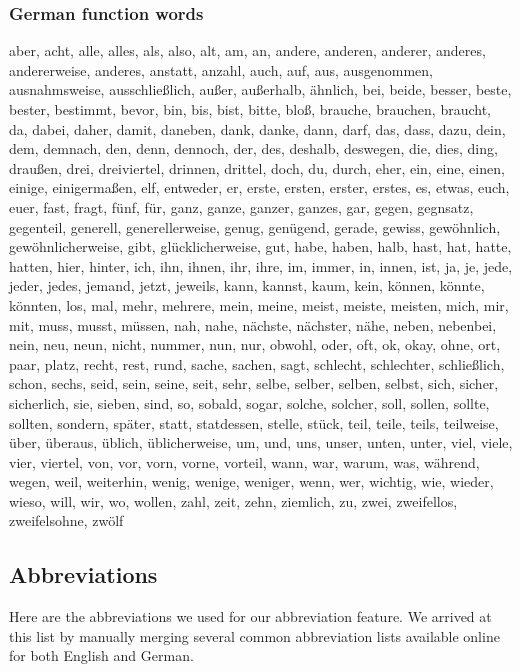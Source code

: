 \subsubsection{German function words}
aber, acht, alle, alles, als, also, alt, am, an, andere, anderen, anderer, anderes, andererweise, anderes, anstatt, anzahl, auch, auf, aus, ausgenommen, ausnahmsweise, ausschließlich, außer, außerhalb, ähnlich, bei, beide, besser, beste, bester, bestimmt, bevor, bin, bis, bist, bitte, bloß, brauche, brauchen, braucht, da, dabei, daher, damit, daneben, dank, danke, dann, darf, das, dass, dazu, dein, dem, demnach, den, denn, dennoch, der, des, deshalb, deswegen, die, dies, ding, draußen, drei, dreiviertel, drinnen, drittel, doch, du, durch, eher, ein, eine, einen, einige, einigermaßen, elf, entweder, er, erste, ersten, erster, erstes, es, etwas, euch, euer, fast, fragt, fünf, für, ganz, ganze, ganzer, ganzes, gar, gegen, gegnsatz, gegenteil, generell, generellerweise, genug, genügend, gerade, gewiss, gewöhnlich, gewöhnlicherweise, gibt, glücklicherweise, gut, habe, haben, halb, hast, hat, hatte, hatten, hier, hinter, ich, ihn, ihnen, ihr, ihre, im, immer, in, innen, ist, ja, je, jede, jeder, jedes, jemand, jetzt, jeweils, kann, kannst, kaum, kein, können, könnte, könnten, los, mal, mehr, mehrere, mein, meine, meist, meiste, meisten, mich, mir, mit, muss, musst, müssen, nah, nahe, nächste, nächster, nähe, neben, nebenbei, nein, neu, neun, nicht, nummer, nun, nur, obwohl, oder, oft, ok, okay, ohne, ort, paar, platz, recht, rest, rund, sache, sachen, sagt, schlecht, schlechter, schließlich, schon, sechs, seid, sein, seine, seit, sehr, selbe, selber, selben, selbst, sich, sicher, sicherlich, sie, sieben, sind, so, sobald, sogar, solche, solcher, soll, sollen, sollte, sollten, sondern, später, statt, statdessen, stelle, stück, teil, teile, teils, teilweise, über, überaus, üblich, üblicherweise, um, und, uns, unser, unten, unter, viel, viele, vier, viertel, von, vor, vorn, vorne, vorteil, wann, war, warum, was, während, wegen, weil, weiterhin, wenig, wenige, weniger, wenn, wer, wichtig, wie, wieder, wieso, will, wir, wo, wollen, zahl, zeit, zehn, ziemlich, zu, zwei, zweifellos, zweifelsohne, zwölf


\subsection{Abbreviations}
\label{sec:app_abbreviations}
Here are the abbreviations we used for our abbreviation feature. We arrived at this list by manually merging several common abbreviation lists available online for both English and German.


